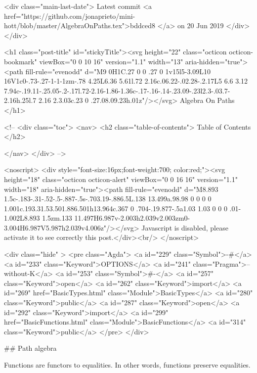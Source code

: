     <div class="main-last-date">
      Latest commit <a href="https://github.com/jonaprieto/mini-hott/blob/master/AlgebraOnPaths.tex">bddced8 </a> on  20 Jun 2019
    </div>
  </div>
  
  <h1 class="post-title" id="stickyTitle"><svg height="22" class="octicon octicon-bookmark" viewBox="0 0 10 16" version="1.1" width="13" aria-hidden="true"><path fill-rule="evenodd" d="M9 0H1C.27 0 0 .27 0 1v15l5-3.09L10 16V1c0-.73-.27-1-1-1zm-.78 4.25L6.36 5.61l.72 2.16c.06.22-.02.28-.2.17L5 6.6 3.12 7.94c-.19.11-.25.05-.2-.17l.72-2.16-1.86-1.36c-.17-.16-.14-.23.09-.23l2.3-.03.7-2.16h.25l.7 2.16 2.3.03c.23 0 .27.08.09.23h.01z"/></svg> Algebra On Paths
  </h1>

  <!-- 
  <div class="toc">
    <nav>
    <h2 class="table-of-contents"> Table of Contents </h2>
      

    </nav>
  </div>
   -->

  <noscript>
  <div style="font-size:16px;font-weight:700; color:red;"><svg height="18" class="octicon octicon-alert" viewBox="0 0 16 16" version="1.1" width="18" aria-hidden="true"><path fill-rule="evenodd" d="M8.893 1.5c-.183-.31-.52-.5-.887-.5s-.703.19-.886.5L.138 13.499a.98.98 0 0 0 0 1.001c.193.31.53.501.886.501h13.964c.367 0 .704-.19.877-.5a1.03 1.03 0 0 0 .01-1.002L8.893 1.5zm.133 11.497H6.987v-2.003h2.039v2.003zm0-3.004H6.987V5.987h2.039v4.006z"/></svg> Javascript is disabled, please activate it to see correctly this post.</div><br/>
  </noscript>

  <div class="hide" >
<pre class="Agda">
<a id="229" class="Symbol">{-#</a> <a id="233" class="Keyword">OPTIONS</a> <a id="241" class="Pragma">--without-K</a> <a id="253" class="Symbol">#-}</a>
<a id="257" class="Keyword">open</a> <a id="262" class="Keyword">import</a> <a id="269" href="BasicTypes.html" class="Module">BasicTypes</a> <a id="280" class="Keyword">public</a>
<a id="287" class="Keyword">open</a> <a id="292" class="Keyword">import</a> <a id="299" href="BasicFunctions.html" class="Module">BasicFunctions</a> <a id="314" class="Keyword">public</a>
</pre>
</div>

## Path algebra

Functions are functors to equalities.  In other words, functions
preserve equalities.

